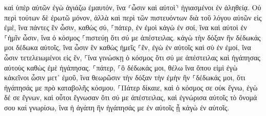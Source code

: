 \documentclass[twoside, 9pt]{extreport}
\begin{document}
καὶ ὑπὲρ αὐτῶν ἐγὼ ἁγιάζω ἐμαυτόν, ἵνα ⸂ὦσιν καὶ αὐτοὶ⸃ ἡγιασμένοι ἐν ἀληθείᾳ. 
Οὐ περὶ τούτων δὲ ἐρωτῶ μόνον, ἀλλὰ καὶ περὶ τῶν πιστευόντων διὰ τοῦ λόγου αὐτῶν εἰς ἐμέ, 
ἵνα πάντες ἓν ὦσιν, καθὼς σύ, ⸀πάτερ, ἐν ἐμοὶ κἀγὼ ἐν σοί, ἵνα καὶ αὐτοὶ ἐν ⸀ἡμῖν ὦσιν, ἵνα ὁ κόσμος ⸀πιστεύῃ ὅτι σύ με ἀπέστειλας. 
κἀγὼ τὴν δόξαν ἣν δέδωκάς μοι δέδωκα αὐτοῖς, ἵνα ὦσιν ἓν καθὼς ἡμεῖς ⸀ἕν, 
ἐγὼ ἐν αὐτοῖς καὶ σὺ ἐν ἐμοί, ἵνα ὦσιν τετελειωμένοι εἰς ἕν, ⸀ἵνα γινώσκῃ ὁ κόσμος ὅτι σύ με ἀπέστειλας καὶ ἠγάπησας αὐτοὺς καθὼς ἐμὲ ἠγάπησας. 
⸀πάτερ, ⸀ὃ δέδωκάς μοι, θέλω ἵνα ὅπου εἰμὶ ἐγὼ κἀκεῖνοι ὦσιν μετ᾽ ἐμοῦ, ἵνα θεωρῶσιν τὴν δόξαν τὴν ἐμὴν ἣν ⸀δέδωκάς μοι, ὅτι ἠγάπησάς με πρὸ καταβολῆς κόσμου. 
⸀Πάτερ δίκαιε, καὶ ὁ κόσμος σε οὐκ ἔγνω, ἐγὼ δέ σε ἔγνων, καὶ οὗτοι ἔγνωσαν ὅτι σύ με ἀπέστειλας, 
καὶ ἐγνώρισα αὐτοῖς τὸ ὄνομά σου καὶ γνωρίσω, ἵνα ἡ ἀγάπη ἣν ἠγάπησάς με ἐν αὐτοῖς ᾖ κἀγὼ ἐν αὐτοῖς. 
\end{document}
